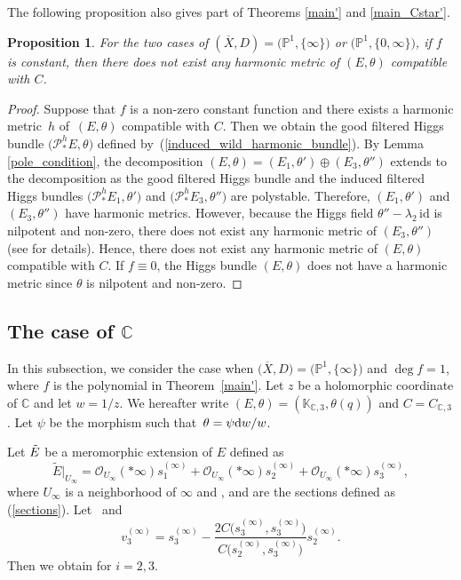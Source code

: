 \documentclass[10pt,a4paper]{amsart}
\numberwithin{equation}{section}
\newtheorem{Proposition}[Theorem]{Proposition}
 { \theoremstyle{definition}
\newtheorem{Definition}[Theorem]{Definition}
\newtheorem{Note}[Theorem]{Note}
\newtheorem{Example}[Theorem]{Example}
\newtheorem{Remark}[Theorem]{Remark}

\newtheorem{Question}[Theorem]{Question}
\newtheorem{Assumption}[Theorem]{Assumption}}
\newcommand{\C}{\mathbb{C}}
\newcommand{\ps}{\mathbb{P}}
\newcommand{\id}{\mathrm{id}}
\begin{document}
The following proposition also gives part of Theorems \ref{main'} and \ref{main_Cstar'}.
\begin{Proposition}\label{remark_degree}
 For the two cases of $(\overline{X},D)=\bigl(\ps^1,\{\infty\}\bigr)$ or $\bigl(\ps^1,\{0,\infty\}\bigr)$, if $f$ is constant, then there does not exist any harmonic metric of $(E,\theta)$ compatible with $C$.
\end{Proposition}
\begin{proof}
 Suppose that $f$ is a non-zero constant function and there exists a harmonic metric~$h$ of~$(E,\theta)$ compatible with $C$. Then we obtain the good filtered Higgs bundle $\bigl(\mathcal{P}^h_{*} E,\theta\bigr)$ defined by~(\ref{induced_wild_harmonic_bundle}).
 By Lemma \ref{pole_condition}, the decomposition $(E,\theta) = (E_1,\theta')\oplus (E_3,\theta '')$ extends to the decomposition as the good filtered Higgs bundle and the induced filtered Higgs bundles $\bigl(\mathcal{P}^h_{*} E_1,\theta'\bigr)$ and $\bigl(\mathcal{P}^h_{*} E_3,\theta''\bigr)$ are polystable. Therefore, $(E_1,\theta')$ and $(E_3,\theta '')$ have harmonic metrics. However, because the Higgs field $\theta''-\lambda_2\,\id$ is nilpotent and non-zero, there does not exist any harmonic metric of $(E_3,\theta '')$ (see \cite[Propositions~3.41 and~3.42]{LM3} for details). Hence, there does not exist any harmonic metric of $(E,\theta)$ compatible with $C$.
 If $f\equiv 0$, the Higgs bundle $(E,\theta)$ does not have a harmonic metric since $\theta$ is nilpotent and non-zero.
\end{proof}

\subsection[The case of C]{The case of $\boldsymbol{\C}$}

In this subsection, we consider the case when $\bigl(\overline{X},D\bigr)=\bigl(\mathbb{P}^1,\{\infty\}\bigr)$ and $\deg{f}= 1$, where $f$ is the polynomial in Theorem~\ref{main'}.
Let $z$ be a holomorphic coordinate of $\C$ and let ${w=1/z}$. We hereafter write $(E,\theta) = (\mathbb{K}_{\C,3},\theta(q))$ and $C=C_{\C,3}$. Let $\psi$ be the morphism such that~${\theta = \psi {\rm d}w/w}$.

Let $\Tilde{E}$ be a meromorphic extension of $E$ defined as
\[
\tilde{E}|_{U_{\infty}} = \mathcal{O}_{U_{\infty}}(*\infty)s^{(\infty)}_1+\mathcal{O}_{U_{\infty}}(*\infty)s^{(\infty)}_2+\mathcal{O}_{U_{\infty}}(*\infty)s^{(\infty)}_3,
\]
where $U_{\infty}$ is a neighborhood of $\infty$ and ,  and  are the sections defined as (\ref{sections}).
Let~ and
\begin{equation*}
 v^{(\infty)}_3 = s^{(\infty)}_3-\frac{2C\bigl(s^{(\infty)}_3,s^{(\infty)}_3\bigr)}{C\bigl(s^{(\infty)}_2,s^{(\infty)}_3\bigr)}s^{(\infty)}_2.
\end{equation*}
Then we obtain  for $i=2,3$.
\end{document}
